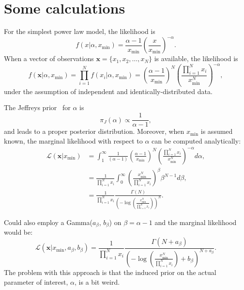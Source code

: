 \documentclass[a4paper, notitlepage, 10pt]{article}
\begin{document}
\section{Some calculations}

For the simplest power law model, the likelihood is
  $$ f(x | \alpha, x_{\min}) = \frac{\alpha - 1}{x_{\min} } \left(\frac{x}{ x_{\min} }\right)^{-\alpha}. $$
When a vector of observations $\boldsymbol x = \{ x_1, x_2, \ldots, x_N\}$ is available, the likelihood is
  $$ f(\boldsymbol x | \alpha,  x_{\min}) =   \prod_{i= 1}^N f(x_i | \alpha, x_{\min}) = \left( \frac{\alpha - 1}{x_{\min} } \right)^N \left(\frac{ \prod_{i= 1}^N x_i}{ x_{\min}^N }\right)^{-\alpha}, $$
under the assumption of independent and identically-distributed data.

The Jeffreys prior~\citep{Jeffreys1946} for $\alpha$ is 
$$ \pi_J(\alpha) \propto \frac{1}{\alpha - 1},$$
and leads to a proper posterior distribution.
Moreover, when $x_{\min}$ is assumed known, the marginal likelihood with respect to $\alpha$ can be computed analytically:
\begin{align*}
\mathcal{L}( \boldsymbol x | x_{\min}) &= \int_{1}^\infty \frac{1}{(\alpha - 1)} \left( \frac{\alpha - 1}{x_{\min} } \right)^N \left(\frac{ \prod_{i= 1}^N x_i}{ x_{\min}^N }\right)^{-\alpha} d\alpha, \\
&= \frac{1}{\prod_{i= 1}^N x_i}\int_{0}^\infty   \left(\frac{x_{\min}^N}{\prod_{i= 1}^N x_i }\right)^\beta \beta^{N-1} d\beta,\\
&= \frac{1}{\prod_{i= 1}^N x_i} \frac{\Gamma(N)}{\left( -\log \left(\frac{x_{\min}^N}{\prod_{i= 1}^N x_i }\right) \right)^N}.
\end{align*}

Could also employ a Gamma($a_\beta$, $b_\beta$) on $\beta = \alpha - 1$ and the marginal likelihood would be:
\begin{equation}
\mathcal{L}( \boldsymbol x |  x_{\min},  a_\beta, b_\beta) = \frac{1}{\prod_{i= 1}^N x_i} \frac{\Gamma(N + a_\beta)}{\left( -\log \left(\frac{x_{\min}^N}{\prod_{i= 1}^N x_i }\right) + b_\beta \right)^{N + a_\beta}}.
\end{equation}
The problem with this approach is that the induced prior on the actual parameter of interest, $\alpha$, is a bit weird.
\end{document}

